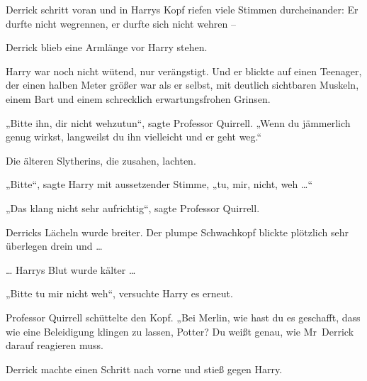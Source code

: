 Derrick schritt voran und in Harrys Kopf riefen viele Stimmen durcheinander: Er durfte nicht wegrennen, er durfte sich nicht wehren –

Derrick blieb eine Armlänge vor Harry stehen.

Harry war noch nicht wütend, nur verängstigt. Und er blickte auf einen Teenager, der einen halben Meter größer war als er selbst, mit deutlich sichtbaren Muskeln, einem Bart und einem schrecklich erwartungsfrohen Grinsen.

„Bitte ihn, dir nicht wehzutun“, sagte Professor Quirrell. „Wenn du jämmerlich genug wirkst, langweilst du ihn vielleicht und er geht weg.“

Die älteren Slytherins, die zusahen, lachten.

„Bitte“, sagte Harry mit aussetzender Stimme, „tu, mir, nicht, weh …“

„Das klang nicht sehr aufrichtig“, sagte Professor Quirrell.

Derricks Lächeln wurde breiter. Der plumpe Schwachkopf blickte plötzlich sehr überlegen drein und …

… Harrys Blut wurde kälter …

„Bitte tu mir nicht weh“, versuchte Harry es erneut.

Professor Quirrell schüttelte den Kopf. „Bei Merlin, wie hast du es geschafft, dass wie eine Beleidigung klingen zu lassen, Potter? Du weißt genau, wie Mr~Derrick darauf reagieren muss.

Derrick machte einen Schritt nach vorne und stieß gegen Harry.

